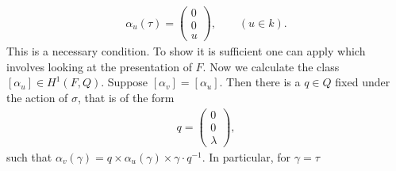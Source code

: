 \begin{align*}
	\alpha_u(\tau) = \left(\begin{matrix} 0 \\ 0 \\ u \end{matrix} \right),\qquad (u\in k).
\end{align*}
This is a necessary condition. To show it is sufficient one can apply \cite[Proposition 2]{martin2004nonab} which involves looking at the presentation of $F$.
Now we calculate the class $[\alpha_u] \in H^1(F, Q)$. Suppose $[\alpha_v] = [\alpha_u]$. Then
there is a $q\in Q$ fixed under the action of $\sigma$, that is of the form
\begin{align*}
	q = \left(\begin{matrix} 0 \\ 0 \\ \lambda\end{matrix}\right),
\end{align*}
such that $\alpha_v(\gamma) = q\times\alpha_u(\gamma)\times\gamma\cdot q^{-1}$. In particular, for $\gamma = \tau$
